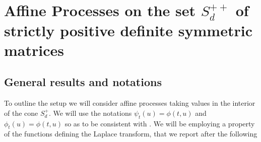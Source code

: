 

\section{Affine Processes on the set $S_{d}^{++}$ of strictly positive definite symmetric matrices}
\subsection{General results and notations}
To outline the setup we will consider affine processes taking values in the interior of the cone $S_d^+$. We will use the notations $\psi_t(u)=\phi(t,u)$ and $\phi_t(u)=\phi(t,u)$ so as to be consistent with \cite{article_KRPT2009}. We will be employing a property of the functions defining the Laplace transform, that we report after the following
 


